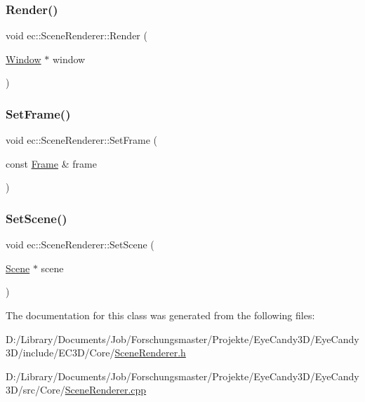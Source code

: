 \mbox{\label{classec_1_1_scene_renderer_a87796739420a581ec2c5f0f80b7a8e1f}} 
\subsubsection{\texorpdfstring{Render()}{Render()}}
{\footnotesize\ttfamily void ec\+::\+Scene\+Renderer\+::\+Render (\begin{DoxyParamCaption}\item[{\mbox{\hyperlink{classec_1_1_window}{Window}} $\ast$}]{window }\end{DoxyParamCaption})}

\mbox{\label{classec_1_1_scene_renderer_a925d9f915b47ea29d30e9db97c82ec80}} 
\subsubsection{\texorpdfstring{Set\+Frame()}{SetFrame()}}
{\footnotesize\ttfamily void ec\+::\+Scene\+Renderer\+::\+Set\+Frame (\begin{DoxyParamCaption}\item[{const \mbox{\hyperlink{classec_1_1_frame}{Frame}} \&}]{frame }\end{DoxyParamCaption})}

\mbox{\label{classec_1_1_scene_renderer_a207e0e7112e94172615228838a34818d}} 
\subsubsection{\texorpdfstring{Set\+Scene()}{SetScene()}}
{\footnotesize\ttfamily void ec\+::\+Scene\+Renderer\+::\+Set\+Scene (\begin{DoxyParamCaption}\item[{\mbox{\hyperlink{classec_1_1_scene}{Scene}} $\ast$}]{scene }\end{DoxyParamCaption})}



The documentation for this class was generated from the following files\+:\begin{DoxyCompactItemize}
\item 
D\+:/\+Library/\+Documents/\+Job/\+Forschungsmaster/\+Projekte/\+Eye\+Candy3\+D/\+Eye\+Candy3\+D/include/\+E\+C3\+D/\+Core/\mbox{\hyperlink{_scene_renderer_8h}{Scene\+Renderer.\+h}}\item 
D\+:/\+Library/\+Documents/\+Job/\+Forschungsmaster/\+Projekte/\+Eye\+Candy3\+D/\+Eye\+Candy3\+D/src/\+Core/\mbox{\hyperlink{_scene_renderer_8cpp}{Scene\+Renderer.\+cpp}}\end{DoxyCompactItemize}
